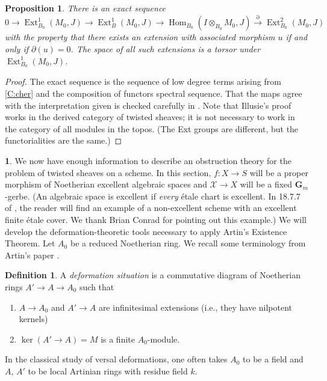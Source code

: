 \documentclass[11pt]{amsart}
\newcommand{\field}[1]{\mathbf #1}
\newcommand{\ms}[1]{\mathscr #1}
\renewcommand{\hom}{\operatorname{Hom}}
\newcommand{\G}{\field G} %
\DeclareMathOperator{\ext}{\operatorname{Ext}}
\renewcommand{\[}{[\!\hspace{0.03em}[}
\renewcommand{\]}{]\!\hspace{0.03em}]}
\renewcommand{\(}{(\!\hspace{0.03em}(}
\renewcommand{\)}{)\!\hspace{0.03em})}
\DeclareMathOperator*{\tensor}{\otimes}
\newcommand{\xto}{\xrightarrow}
\newtheorem{prop}[lem]{Proposition}
\theoremstyle{definition}
\newtheorem{defn}[lem]{Definition}
\newtheorem{para}[lem]{\indent}
\theoremstyle{remark}
\begin{document}
\begin{prop}\label{P:cher deformation theory}  There is an exact sequence
    $$0\to\ext^{1}_{B_{0}}(M_{0},J)\to\ext^{1}_{B}(M_{0},J)\to\hom_{B_{0}}(I\tensor_{B_{0}}M_{0},J)\xto{\partial}\ext^{2}_{B_{0}}(M_{0},J)$$
with the property that there exists an extension with associated 
morphism $u$ if and only if $\partial(u)=0$.  The space of all such 
extensions is a torsor under $\ext^{1}_{B_{0}}(M_{0},J)$.
\end{prop}
\begin{proof} The exact sequence is the sequence of low degree terms arising 
from \ref{C:cher} and the composition of functors spectral sequence.  
That the maps agree with the interpretation given is checked carefully 
in \cite[p.\ 252ff]{illusie}.  Note that Illusie's proof works in the derived 
category of twisted sheaves; it is not necessary to work in the 
category of all modules in the topos. (The Ext groups are different, but the 
functorialities are the same.)
\end{proof}

\begin{para}\label{Para:obstruction} We now have enough information to describe an obstruction theory for 
the problem of twisted sheaves on a scheme.  In this section, $f:X\to S$ 
will be a proper morphism of Noetherian excellent algebraic spaces and
$\ms X\to X$ will be a 
fixed $\G_{m}$-gerbe.  (An algebraic space is excellent if 
\emph{every\/} \'etale chart is excellent.  In 18.7.7 of \cite{ega4-4}, the reader 
will find an example of a non-excellent scheme with an excellent 
finite \'etale cover.  We thank Brian Conrad for pointing out this example.)  
We will develop the deformation-theoretic tools 
necessary to apply Artin's Existence Theorem.  Let $A_{0}$ be a 
reduced Noetherian ring.  We recall some terminology from Artin's 
paper \cite{artin}.
\end{para}
\begin{defn} A \emph{deformation situation\/} is a commutative 
diagram of Noetherian rings $A'\to A\to A_{0}$ such that 
\begin{enumerate}
    \item $A\to A_{0}$ and $A'\to A$ are infinitesimal extensions 
    (i.e., they have nilpotent kernels)

    \item $\ker(A'\to A)=M$ is a finite $A_{0}$-module.
\end{enumerate}
\end{defn}
In the classical study of versal deformations, one often takes $A_{0}$ 
to be a field and $A$, $A'$ to be local Artinian rings with residue 
field $k$.
\end{document}
